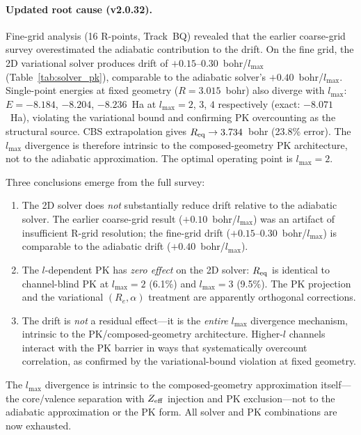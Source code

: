 \documentclass[aps,pra,twocolumn,superscriptaddress,longbibliography,floatfix]{revtex4-2}
\begin{document}
\paragraph{Updated root cause (v2.0.32).}
Fine-grid analysis (16 R-points, Track~BQ) revealed that the earlier
coarse-grid survey overestimated the adiabatic contribution to the
drift.  On the fine grid, the 2D variational solver produces drift of
$+0.15$--$0.30$~bohr/$l_{\max}$ (Table~\ref{tab:solver_pk}),
comparable to the adiabatic solver's $+0.40$~bohr/$l_{\max}$.
Single-point energies at fixed geometry ($R = 3.015$~bohr) also
diverge with $l_{\max}$: $E = -8.184$, $-8.204$, $-8.236$~Ha at
$l_{\max} = 2$, $3$, $4$ respectively (exact: $-8.071$~Ha), violating
the variational bound and confirming PK overcounting as the structural
source.  CBS extrapolation gives $R_{\rm eq} \to 3.734$~bohr (23.8\%
error).  The $l_{\max}$ divergence is therefore intrinsic to the
composed-geometry PK architecture, not to the adiabatic approximation.
The optimal operating point is $l_{\max} = 2$.

Three conclusions emerge from the full survey:
\begin{enumerate}
  \item The 2D solver does \emph{not} substantially reduce drift
    relative to the adiabatic solver.  The earlier coarse-grid result
    ($+0.10$~bohr/$l_{\max}$) was an artifact of insufficient R-grid
    resolution; the fine-grid drift ($+0.15$--$0.30$~bohr/$l_{\max}$)
    is comparable to the adiabatic drift ($+0.40$~bohr/$l_{\max}$).
  \item The $l$-dependent PK has \emph{zero effect} on the 2D solver:
    $R_{\rm eq}$ is identical to channel-blind PK at $l_{\max} = 2$
    (6.1\%) and $l_{\max} = 3$ (9.5\%).  The PK projection and the
    variational $(R_e, \alpha)$ treatment are apparently orthogonal
    corrections.
  \item The drift is \emph{not} a residual effect---it is the
    \emph{entire} $l_{\max}$ divergence mechanism, intrinsic to the
    PK/composed-geometry architecture.  Higher-$l$ channels interact
    with the PK barrier in ways that systematically overcount
    correlation, as confirmed by the variational-bound violation at
    fixed geometry.
\end{enumerate}
The $l_{\max}$ divergence is intrinsic to the composed-geometry
approximation itself---the core/valence separation with $Z_{\rm eff}$
injection and PK exclusion---not to the adiabatic approximation or
the PK form.  All solver and PK combinations are now exhausted.
\end{document}
